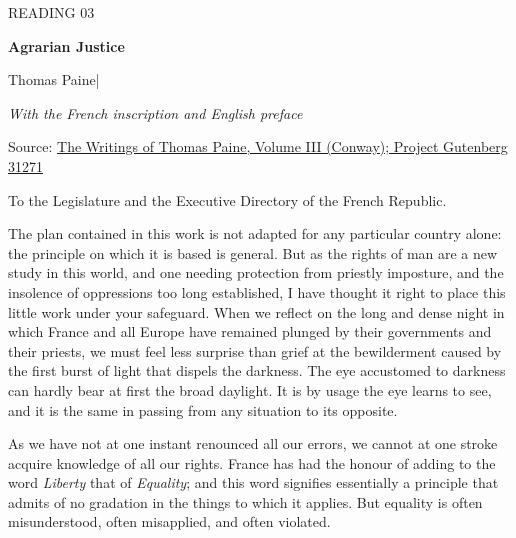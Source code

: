 \begingroup

\setlength{\parskip}{7pt plus 0.75pt minus 0.5pt}

\fontsize{12}{17.5}\selectfont

\thispagestyle{fancy}
\label{article-03}
\begingroup\raggedright
\setlength{\parindent}{0pt}
{\fontsize{9}{12}\selectfont\color{headgrey}READING 03\par}
\vspace{4pt}
{\fontsize{24}{30}\selectfont\bfseries Agrarian Justice\par}
\vspace{7pt}
{\fontsize{12}{18}\selectfont Thomas Paine\quad|\par}
\vspace{4pt}
{\fontsize{11}{16}\selectfont\itshape With the French inscription and English preface\par}
\vspace{4pt}
{\fontsize{9}{12.5}\selectfont\color{headgrey}Source: \href{https://www.gutenberg.org/ebooks/31271}{The Writings of Thomas Paine, Volume III (Conway); Project Gutenberg 31271}\par}
\endgroup
\vspace{6pt}


To the Legislature and the Executive Directory of the French Republic.\par

The plan contained in this work is not adapted for any particular country alone: the principle on which it is based is general. But as the rights of man are a new study in this world, and one needing protection from priestly imposture, and the insolence of oppressions too long established, I have thought it right to place this little work under your safeguard. When we reflect on the long and dense night in which France and all Europe have remained plunged by their governments and their priests, we must feel less surprise than grief at the bewilderment caused by the first burst of light that dispels the darkness. The eye accustomed to darkness can hardly bear at first the broad daylight. It is by usage the eye learns to see, and it is the same in passing from any situation to its opposite.\par

As we have not at one instant renounced all our errors, we cannot at one stroke acquire knowledge of all our rights. France has had the honour of adding to the word \textit{Liberty} that of \textit{Equality}; and this word signifies essentially a principle that admits of no gradation in the things to which it applies. But equality is often misunderstood, often misapplied, and often violated.\par

